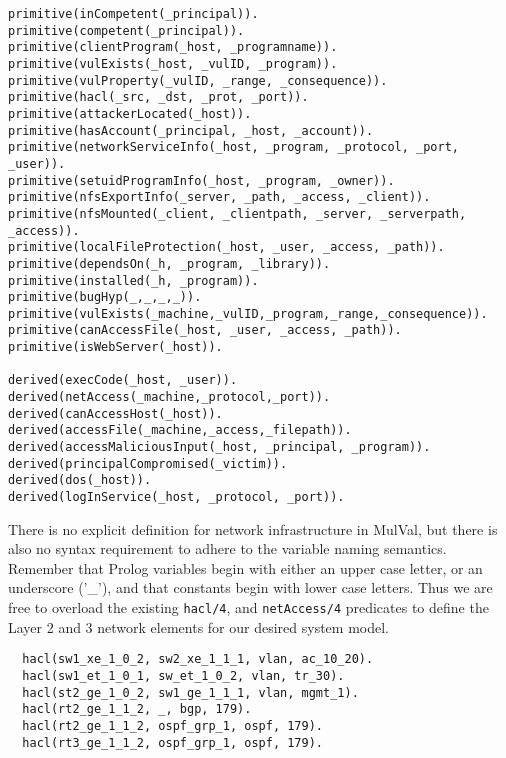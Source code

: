 \begin{lstlisting}[style=datalog, label={lst:mulval_primitives}, caption={Mulval Primitive and Derived Facts}]
primitive(inCompetent(_principal)).
primitive(competent(_principal)).
primitive(clientProgram(_host, _programname)).
primitive(vulExists(_host, _vulID, _program)).
primitive(vulProperty(_vulID, _range, _consequence)).
primitive(hacl(_src, _dst, _prot, _port)).
primitive(attackerLocated(_host)).
primitive(hasAccount(_principal, _host, _account)).
primitive(networkServiceInfo(_host, _program, _protocol, _port, _user)).
primitive(setuidProgramInfo(_host, _program, _owner)).
primitive(nfsExportInfo(_server, _path, _access, _client)).
primitive(nfsMounted(_client, _clientpath, _server, _serverpath, _access)).
primitive(localFileProtection(_host, _user, _access, _path)).
primitive(dependsOn(_h, _program, _library)).
primitive(installed(_h, _program)).
primitive(bugHyp(_,_,_,_)).
primitive(vulExists(_machine,_vulID,_program,_range,_consequence)).
primitive(canAccessFile(_host, _user, _access, _path)).
primitive(isWebServer(_host)).

derived(execCode(_host, _user)).
derived(netAccess(_machine,_protocol,_port)).
derived(canAccessHost(_host)).
derived(accessFile(_machine,_access,_filepath)).
derived(accessMaliciousInput(_host, _principal, _program)).
derived(principalCompromised(_victim)).
derived(dos(_host)).
derived(logInService(_host, _protocol, _port)).
\end{lstlisting}

There is no explicit definition for network infrastructure in MulVal, but there is also no syntax requirement to adhere to the variable naming semantics. Remember that Prolog variables begin with either an upper case letter, or an underscore ('\_'),  and that constants begin with lower case letters. Thus we are free to overload the existing \verb|hacl/4|, and \verb|netAccess/4| predicates to define the Layer 2 and 3 network elements for our desired system model.

\begin{verbatim}
  hacl(sw1_xe_1_0_2, sw2_xe_1_1_1, vlan, ac_10_20).   
  hacl(sw1_et_1_0_1, sw_et_1_0_2, vlan, tr_30). 
  hacl(st2_ge_1_0_2, sw1_ge_1_1_1, vlan, mgmt_1). 
  hacl(rt2_ge_1_1_2, _, bgp, 179). 
  hacl(rt2_ge_1_1_2, ospf_grp_1, ospf, 179).
  hacl(rt3_ge_1_1_2, ospf_grp_1, ospf, 179).
\end{verbatim}



